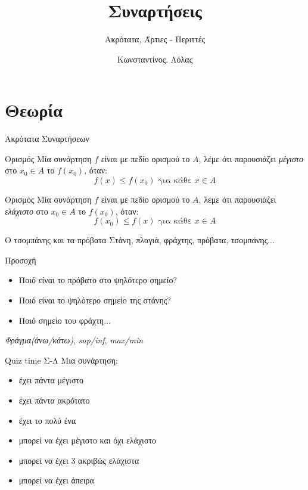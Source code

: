 \documentclass{presentation}
\title{Συναρτήσεις}
\subtitle{Ακρότατα, Άρτιες - Περιττές}
\author[Λόλας]{Κωνσταντίνος. Λόλας}
\begin{document}
\begin{frame}
  \titlepage
\end{frame}

\section{Θεωρία}
\begin{frame}{Ακρότατα Συναρτήσεων}
  \begin{block}{Ορισμός}
    Μία συνάρτηση $f$ είναι με πεδίο ορισμού το $Α$, λέμε ότι παρουσιάζει \emph{μέγιστο} στο $x_0\in Α$ το $f(x_0)$, όταν:
    $$f(x)\le f(x_0)\text{ για κάθε } x\in Α$$
  \end{block} \pause
  \begin{block}{Ορισμός}
    Μία συνάρτηση $f$ είναι με πεδίο ορισμού το $Α$, λέμε ότι παρουσιάζει \emph{ελάχιστο} στο $x_0\in Α$ το $f(x_0)$, όταν:
    $$f(x_0)\le f(x)\text{ για κάθε } x\in Α$$
  \end{block}
\end{frame}

\begin{frame}{Ο τσομπάνης και τα πρόβατα}
  Στάνη, πλαγιά, φράχτης, πρόβατα, τσομπάνης... \pause
  \begin{alertblock}{Προσοχή}
    \begin{itemize}
      \item Ποιό είναι το πρόβατο στο ψηλότερο σημείο?
      \item Ποιό είναι το ψηλότερο σημείο της στάνης?
      \item Ποιό σημείο του φράχτη...
    \end{itemize}
  \end{alertblock}
  \emph{Φράγμα(άνω/κάτω)}, \emph{sup/inf}, \emph{max/min}
\end{frame}

\begin{frame}{Quiz time Σ-Λ}
  Μια συνάρτηση:
  \begin{itemize}
    \item έχει πάντα μέγιστο\pause
    \item έχει πάντα ακρότατο\pause
    \item έχει το πολύ ένα \pause
    \item μπορεί να έχει μέγιστο και όχι ελάχιστο \pause
    \item μπορεί να έχει 3 ακριβώς ελάχιστα \pause
    \item μπορεί να έχει άπειρα
  \end{itemize}
\end{frame}
\end{document}
